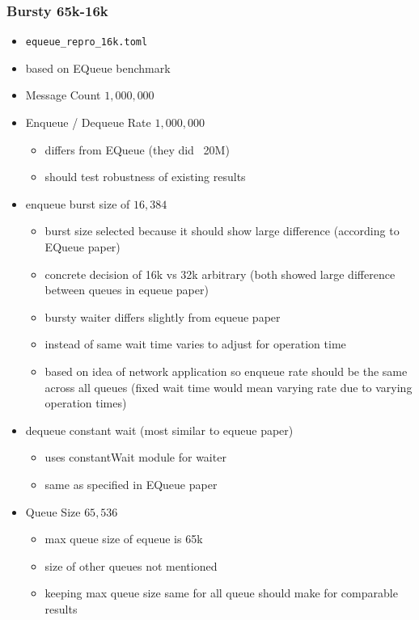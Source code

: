 \subsubsection{Bursty 65k-16k}
\label{sec:bench-bursty-65k-16k}
\begin{itemize}
    \item \texttt{equeue\_repro\_16k.toml}
    \item based on EQueue benchmark
    \item Message Count $1,000,000$
    \item Enqueue / Dequeue Rate $1,000,000$
        \begin{itemize}
            \item differs from EQueue (they did ~20M)
            \item should test robustness of existing results 
        \end{itemize}
    \item enqueue burst size of $16,384$
        \begin{itemize}
            \item burst size selected because it should show large difference (according to EQueue paper)
            \item concrete decision of 16k vs 32k arbitrary (both showed large difference between queues in
                equeue paper)
            \item bursty waiter differs slightly from equeue paper
            \item instead of same wait time varies to adjust for operation time
            \item based on idea of network application so enqueue rate should be the same across all queues
                (fixed wait time would mean varying rate due to varying operation times)
        \end{itemize}
    \item dequeue constant wait (most similar to equeue paper)
        \begin{itemize}
            \item uses constantWait module for waiter
            \item same as specified in EQueue paper
        \end{itemize}
    \item Queue Size $65,536$
        \begin{itemize}
            \item max queue size of equeue is 65k
            \item size of other queues not mentioned
            \item keeping max queue size same for all queue should make for comparable results
        \end{itemize}
\end{itemize}

